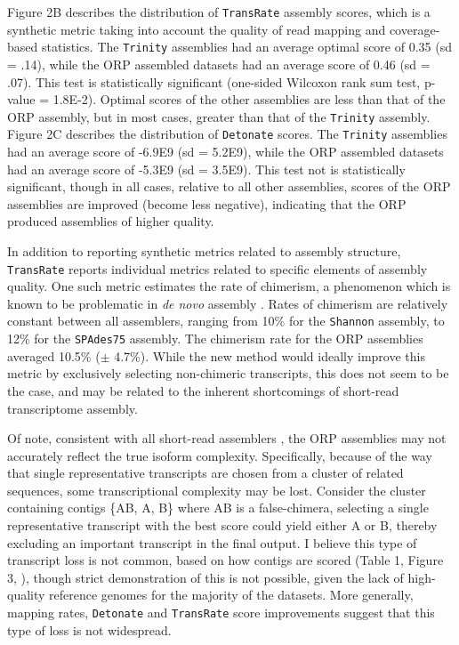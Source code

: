 \documentclass[10pt,letterpaper]{article}
\newcommand{\tit}{\textit}
\begin{document}
Figure 2B describes the distribution of \texttt{TransRate} assembly scores, which is a synthetic metric taking into account the quality of read mapping and coverage-based statistics. The \texttt{Trinity} assemblies had an average optimal score of 0.35 (sd = .14), while the ORP assembled datasets had an average score of 0.46 (sd = .07). This test is statistically significant (one-sided Wilcoxon rank sum test, p-value = 1.8E-2). Optimal scores of the other assemblies are less than that of the ORP assembly, but in most cases, greater than that of the \texttt{Trinity} assembly. Figure 2C describes the distribution of \texttt{Detonate} scores. The \texttt{Trinity} assemblies had an average score of -6.9E9 (sd = 5.2E9), while the ORP assembled datasets had an average score of -5.3E9 (sd = 3.5E9). This test not is statistically significant, though in all cases, relative to all other assemblies, scores of the ORP assemblies are improved (become less negative), indicating that the ORP produced assemblies of higher quality. 

In addition to reporting synthetic metrics related to assembly structure, \texttt{TransRate} reports individual metrics related to specific elements of assembly quality. One such metric estimates the rate of chimerism, a phenomenon which is known to be problematic in \tit{de novo} assembly \citep{Ungaro:2017kf, Singhal:2013dq}. Rates of chimerism are relatively constant between all assemblers, ranging from 10\% for the \texttt{Shannon} assembly, to 12\% for the \texttt{SPAdes75} assembly. The chimerism rate for the ORP assemblies averaged 10.5\% ($\pm$ 4.7\%). While the new method would ideally improve this metric by exclusively selecting non-chimeric transcripts, this does not seem to be the case, and may be related to the inherent shortcomings of short-read transcriptome assembly.

Of note, consistent with all short-read assemblers \citep{Ungaro:2017kf}, the ORP assemblies may not accurately reflect the true isoform complexity. Specifically, because of the way that single representative transcripts are chosen from a cluster of related sequences, some transcriptional complexity may be lost. Consider the cluster containing contigs \{AB, A, B\} where AB is a false-chimera, selecting a single representative transcript with the best score could yield either A or B, thereby excluding an important transcript in the final output. I believe this type of transcript loss is not common, based on how contigs are scored (Table 1, Figure 3, \cite{SmithUnna:2016go}), though strict demonstration of this is not possible, given the lack of high-quality reference genomes for the majority of the datasets. More generally, mapping rates, \texttt{Detonate} and \texttt{TransRate} score improvements suggest that this type of loss is not widespread.
\end{document}
